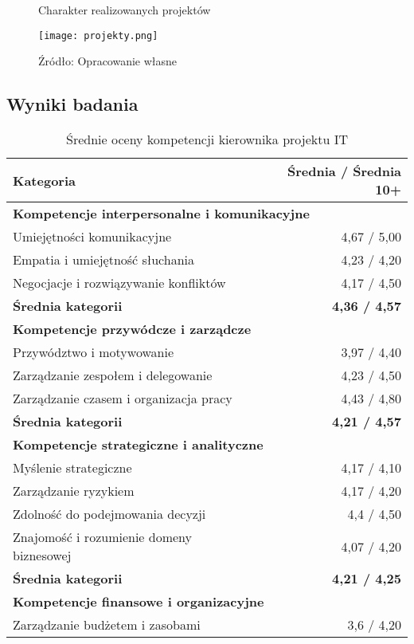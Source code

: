 \begin{figure}
  \caption{Charakter realizowanych projektów}
  \centering
  \texttt{[image: projekty.png]}
  \caption*{Źródło: Opracowanie własne}
\end{figure}

\subsection{Wyniki badania}

\begin{table}[htbp]
\centering
\caption{Średnie oceny kompetencji kierownika projektu IT}
\begin{tabular}{p{8cm} r}
\toprule
\textbf{Kategoria} & \textbf{Średnia / Średnia 10+} \\
\midrule
\multicolumn{2}{l}{\textbf{Kompetencje interpersonalne i komunikacyjne}} \\
Umiejętności komunikacyjne & 4{,}67 / 5{,}00 \\
Empatia i umiejętność słuchania & 4{,}23 / 4{,}20 \\
Negocjacje i rozwiązywanie konfliktów & 4{,}17 / 4{,}50 \\
\textbf{Średnia kategorii} & \textbf{4{,}36 / 4{,}57} \\  
\midrule
\multicolumn{2}{l}{\textbf{Kompetencje przywódcze i zarządcze}} \\
Przywództwo i motywowanie & 3{,}97 / 4{,}40 \\
Zarządzanie zespołem i delegowanie & 4{,}23 / 4{,}50 \\
Zarządzanie czasem i organizacja pracy & 4{,}43 / 4{,}80 \\
\textbf{Średnia kategorii} & \textbf{4{,}21 / 4{,}57} \\
\midrule
\multicolumn{2}{l}{\textbf{Kompetencje strategiczne i analityczne}} \\
Myślenie strategiczne & 4{,}17 / 4{,}10 \\
Zarządzanie ryzykiem & 4{,}17 / 4{,}20 \\
Zdolność do podejmowania decyzji & 4{,}4 / 4{,}50 \\
Znajomość i rozumienie domeny biznesowej & 4{,}07 / 4{,}20 \\
\textbf{Średnia kategorii} & \textbf{4{,}21 / 4{,}25} \\
\midrule
\multicolumn{2}{l}{\textbf{Kompetencje finansowe i organizacyjne}} \\
Zarządzanie budżetem i zasobami & 3{,}6 / 4{,}20 \\

\end{tabular}
\end{table}
